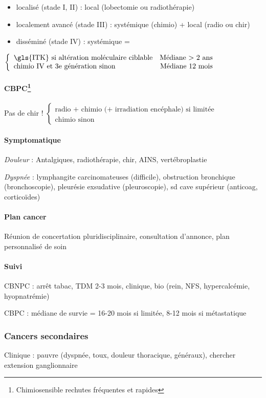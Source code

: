 \documentclass[11pt]{article}
\begin{document}
\begin{itemize}
\item localisé (stade I, II) : local (lobectomie ou radiothérapie)
\item localement avancé (stade III) : systémique (chimio) + local (radio ou
chir)
\item disséminé (stade IV) : systémique =
\end{itemize}
$\left \{
  \begin{array}{lr}
    \text{\gls{ITK} si altération moléculaire ciblable} & \text{Médiane > 2 ans}\\
    \text{chimio IV et 3e génération sinon} & \text{Médiane 12 mois}\\
  \end{array}
\right.$
\paragraph{CBPC\footnote{Chimiosensible rechutes fréquentes et rapides}}
\label{sec:orgdcd89e6}
Pas de chir !
$
\left \{
  \begin{array}{l}
    \text{radio + chimio (+ irradiation encéphale) si limitée}\\
    \text{chimio sinon}
  \end{array}
\right.
$
\paragraph{Symptomatique}
\label{sec:orgd80429f}
\emph{Douleur}  : Antalgiques, radiothérapie, chir, AINS, vertébroplastie

\emph{Dyspnée}  : lymphangite carcinomateuses (difficile), obstruction bronchique
(bronchoscopie), pleurésie exsudative (pleuroscopie), sd cave supérieur
(anticoag, corticoïdes)

\paragraph{Plan cancer}
\label{sec:org1f260dd}
Réunion de concertation pluridisciplinaire, consultation d'annonce, plan
personnalisé de soin
\paragraph{Suivi}
\label{sec:org42ee7c9}
CBNPC : arrêt tabac, TDM 2-3 mois, clinique, bio (rein, NFS, hypercalcémie,
hyopnatrémie)

CBPC : médiane de survie = 16-20 mois si limitée, 8-12 mois si métastatique
\subsubsection{Cancers secondaires}
\label{sec:org03e84bd}
Clinique : pauvre (dyspnée, toux, douleur thoracique, généraux), chercher extension ganglionnaire
\end{document}
